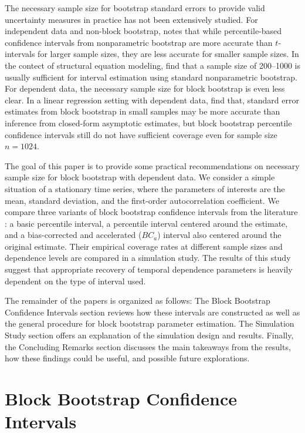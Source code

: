 \documentclass[12pt, letterpaper, titlepage]{article}
\begin{document}
The necessary sample size for bootstrap standard errors to provide valid
uncertainty measures in practice has not been extensively studied. For
independent data and non-block bootstrap, \citet{hesterberg2015teachers} notes
that while percentile-based confidence intervals from nonparametric bootstrap
are more accurate than $t$-intervals for larger sample sizes, they are
less accurate for smaller sample sizes. In the contect of structural equation
modeling, \citet{nevitt2001performance} find
that a sample size of 200--1000 is usually sufficient for interval estimation
using standard nonparametric bootstrap. For dependent data, the necessary sample
size for block bootstrap is even less clear. In a linear regression setting with
dependent data, \citet{goncalves2005bootstrap} find that, standard error
estimates from block bootstrap in small samples may be more accurate than
inference from closed-form asymptotic estimates, but block bootstrap percentile
confidence intervals still do not have sufficient coverage even for sample size
$n = 1024$.


The goal of this paper is to provide some practical recommendations on
necessary sample size for block bootstrap with dependent data. We consider a
simple situation of a stationary time series, where the parameters of
interests are the mean, standard deviation, and the first-order
autocorrelation coefficient. We compare three variants of block bootstrap
confidence intervals from the literature \citep{diciccio1996bootstrap,
  rice2006mathematical}: a basic percentile interval, a percentile
interval centered around the estimate, and a bias-corrected and
accelerated ($BC_a$) interval also centered around the original estimate. Their
empirical coverage rates at different sample sizes and dependence levels are
compared in a simulation study. The results of this study suggest that
appropriate recovery of temporal dependence parameters is heavily dependent on
the type of interval used.


The remainder of the papers is organized as follows:
The Block Bootstrap Confidence Intervals section reviews how these intervals
are constructed as well as the general procedure for block bootstrap parameter
estimation. The Simulation Study section offers an explanation of the
simulation design and results. Finally, the Concluding Remarks section
discusses the main takeaways from the results, how these findings could be
useful, and possible future explorations.


\section{Block Bootstrap Confidence Intervals}
\label{sec:blkbootreview}
\end{document}

